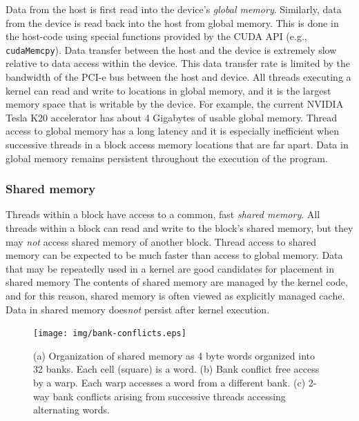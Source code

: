 Data from the host is first read into the
device's \emph{global memory}.
Similarly, data from the device is read back into the host
from global memory.
This is done in the host-code
using special functions provided by the CUDA API 
(e.g., \texttt{cudaMemcpy}).
Data transfer between the host and the device is
extremely slow relative to data access within the device.
This data transfer rate is limited by the bandwidth
of the PCI-e bus between the host and device.
All threads executing a kernel can
read and write to locations in global memory,
and it is the largest memory space that is
writable by the device.
For example, the current NVIDIA Tesla K20 accelerator
has about 4 Gigabytes of usable global memory.
Thread access to global memory has a long latency
and it is especially inefficient when
successive threads in a block access memory locations
that are far apart.
Data in global memory remains persistent
throughout the execution of the program.

\subsubsection{Shared memory}
\label{subsubsec:shared-memory}

Threads within a block have access to a
common, fast \emph{shared memory}.
All threads within a block
can read and write to the block's shared memory,
but they may \emph{not} access
shared memory of another block.
Thread access to shared memory can be expected to be
much faster than access to global memory.
Data that may be repeatedly used in a kernel
are good candidates for placement in shared memory
The contents of shared memory are managed by the kernel code,
and for this reason,
shared memory is often viewed as explicitly managed cache.
Data in shared memory does\emph{not} persist after
kernel execution.

\begin{figure}
\begin{center}
\texttt{[image: img/bank-conflicts.eps]}
\end{center}
\caption{(a) Organization of shared memory as 4 byte words
    organized into 32 banks. Each cell (square) is a word.
    (b) Bank conflict free access by a warp. Each warp
    accesses a word from a different bank. (c) 2-way
    bank conflicts arising from successive threads accessing
alternating words.}
\label{fig:bank-conflicts}
\end{figure}

